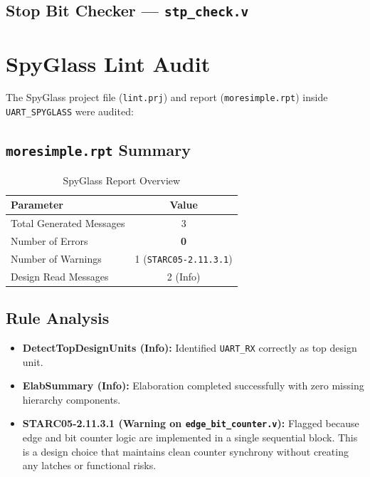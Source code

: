 \documentclass[12pt,a4paper]{article}
\begin{document}
\subsection{Stop Bit Checker — \texttt{stp\_check.v}}


\section{SpyGlass Lint Audit}

The SpyGlass project file (\texttt{lint.prj}) and report (\texttt{moresimple.rpt}) inside \texttt{UART\_SPYGLASS} were audited:

\subsection{\texttt{moresimple.rpt} Summary}

\begin{table}[H]
\centering
\caption{SpyGlass Report Overview}
\begin{tabular}{lc}
\toprule
\textbf{Parameter} & \textbf{Value} \\
\midrule
Total Generated Messages & 3 \\
Number of Errors & \textbf{0} \\
Number of Warnings & 1 (\texttt{STARC05-2.11.3.1}) \\
Design Read Messages & 2 (Info) \\
\bottomrule
\end{tabular}
\end{table}

\subsection{Rule Analysis}
\begin{itemize}
    \item \textbf{DetectTopDesignUnits (Info):} Identified \texttt{UART\_RX} correctly as top design unit.
    \item \textbf{ElabSummary (Info):} Elaboration completed successfully with zero missing hierarchy components.
    \item \textbf{STARC05-2.11.3.1 (Warning on \texttt{edge\_bit\_counter.v}):} Flagged because edge and bit counter logic are implemented in a single sequential block. This is a design choice that maintains clean counter synchrony without creating any latches or functional risks.
\end{itemize}
\end{document}
